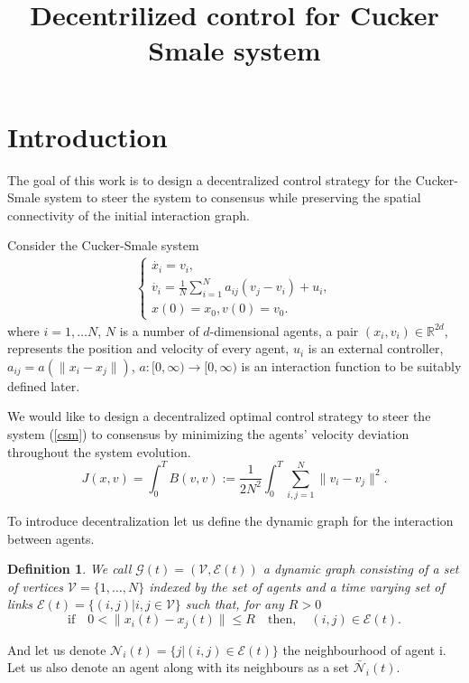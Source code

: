 \documentclass[a4paper,10pt, english]{article}
\newcommand{\D}{\displaystyle}
\newtheorem{dfn}{Definition}[section]
\begin{document}
\title{Decentrilized control for Cucker Smale system}
\author{}
\maketitle












\section{Introduction}
The goal of this work is to design a decentralized control strategy for the Cucker-Smale system to steer the system to consensus while preserving the spatial connectivity of the initial interaction graph.

Consider the Cucker-Smale system
\begin{align}
\begin{cases}
\D
\dot{x_i} = v_i,\\
\dot{v_i} = \frac{1}{N}\sum_{i=1}^{N}a_{ij}(v_j - v_i) + u_i, \\
x(0) = x_0,
v(0) = v_0.
\end{cases}
\label{csm}
\end{align}
where $i=1,\dots N$, $N$ is a number of $d$-dimensional agents, a pair $(x_i, v_i)\in \mathbb{R}^{2d}$, represents the position and velocity of every agent, $u_i$ is an external controller,  $a_{ij} = a(\|x_i - x_j\|)$,  $a:[0, \infty)\longrightarrow [0, \infty)$ is an interaction function to be suitably defined later.

We would like to design a decentralized optimal control strategy to steer the system (\ref{csm}) to consensus by minimizing the agents' velocity deviation throughout the system evolution.
\begin{equation}
J(x, v) = \int_{0}^{T}B(v, v):= \frac{1}{2N^2}\int_{0}^{T}\sum_{i, j = 1}^{N}\|v_i - v_j\|^2.
\label{Vt}
\end{equation}


To introduce decentralization let us define the dynamic graph for the interaction between agents.
\begin{dfn}
We call $\mathcal{G}(t) =  (\mathcal{V}, \mathcal{E}(t) )$ a dynamic graph consisting of a set of vertices $\mathcal{V} = \{1, \dots,  N\}$ indexed by the set of agents and a time varying set of links 
$\mathcal{E}(t) = \{(i, j)|i, j \in \mathcal{V}\}$ such that, for any $R>0$
$$
\mbox{if}\quad 0<\|x_i(t) - x_j(t)\| \leq R \quad\mbox{then},\quad (i, j)\in \mathcal{E}(t).
$$
\end{dfn}
And let us denote $\mathcal{N}_i(t) = \{j|(i, j)\in\mathcal{E}(t)\}$ the neighbourhood of agent i.
Let us also denote an agent along with its neighbours as a set $\bar{\mathcal{N}}_i(t)$.
\end{document}

